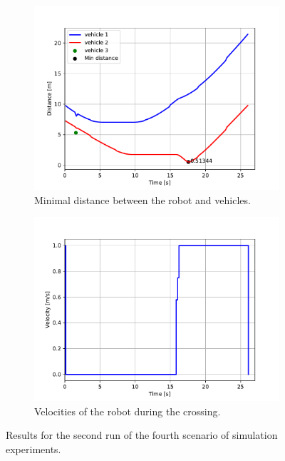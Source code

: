             \begin{figure}[H]
                \centering
                \begin{subfigure}{0.49\linewidth}
                    \centering
                    \includegraphics[trim={24 8 40 41}, clip, width=\linewidth]{images/simulations/scene4_2_dist.pdf}
                    \caption{Minimal distance between the robot and vehicles.}
                \end{subfigure}
                \begin{subfigure}{0.49\linewidth}
                    \centering
                    \includegraphics[trim={21 8 40 41}, clip, width=\linewidth]{images/simulations/scene4_2_vel.pdf}
                    \caption{Velocities of the robot during the crossing.}
                \end{subfigure}
                \caption{Results for the second run of the fourth scenario of simulation experiments.}
                \label{fig:scene4_2_graphs}
            \end{figure}
        \\
